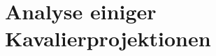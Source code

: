 

\setcounter{P-section}{5}
\renewcommand*\thesection{P\Nummerierung{\arabic{P-section}}}
\section{Analyse einiger Kavalierprojektionen}

